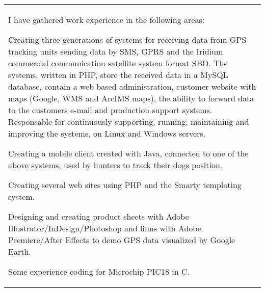 \documentclass[a4paper, oneside, final]{scrartcl} %
\begin{document}
\begin{center}
\begin{tabularx}{0.97\linewidth}{X}
 I have gathered work experience in the following areas:
\begin{compactitem}
  \item Creating three generations of systems for receiving data from
    GPS-tracking units sending data by SMS, GPRS and the Iridium
    commercial communication satellite system format SBD.
    The systems, written in PHP, store the received data in a MySQL
    database, contain a web based administration, customer website
    with maps (Google, WMS and ArcIMS maps), the ability to forward
    data to the customers e-mail and production support
    systems. Responsable for continuously supporting, running,
    maintaining and improving the systems, on Linux and Windows
    servers.
  \item Creating a mobile client created with Java, connected to
    one of the above systems, used by hunters to track their dogs
    position.
  \item Creating several web sites using PHP and the Smarty templating
    system.
  \item Designing and creating product sheets with Adobe
    Illustrator/InDesign/Photoshop and films with Adobe Premiere/After
    Effects to demo GPS data visualized by Google Earth.
  \item Some experience coding for Microchip PIC18 in C.
\end{compactitem}
\end{tabularx}


\end{center}
\end{document}
